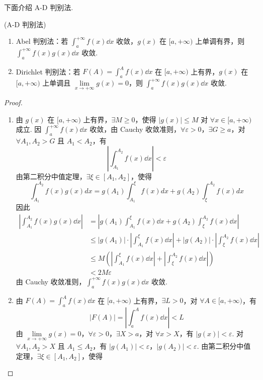 下面介绍 A-D 判别法.
\begin{proposition}(A-D 判别法)
	
	\begin{enumerate}
		\item Abel 判别法：若 $\displaystyle\int_a^{+\infty} f(x)\dd x$ 收敛，$g(x)$ 在 $[a,+\infty)$ 上单调有界，则 $\displaystyle\int_a^{+\infty} f(x)g(x)\dd x$ 收敛.
		\item Dirichlet 判别法：若 $F(A)=\displaystyle\int_a^A f(x)\dd x$ 在 $[a,+\infty)$ 上有界，$g(x)$ 在 $[a,+\infty)$ 上单调且 $\lim\limits_{x \to +\infty} g(x)=0$，则 $\displaystyle\int_a^{+\infty} f(x)g(x)\dd x$ 收敛.
	\end{enumerate}
\end{proposition}
\begin{proof}
	\begin{enumerate}
		\item 由 $g(x)$ 在 $[a,+\infty)$ 上有界，$\exists M \ge 0$，使得 $|g(x)| \le M$ 对 $\forall x \in [a,+\infty)$ 成立.
		因 $\displaystyle\int_a^{+\infty} f(x)\dd x$ 收敛，由 Cauchy 收敛准则，$\forall \varepsilon>0$，$\exists G \ge a$，对 $\forall A_1,A_2 > G$ 且 $A_1 < A_2$，有
		\[
		\left| \int_{A_1}^{A_2} f(x)\dd x \right| < \varepsilon
		\]
		由第二积分中值定理，$\exists \xi \in [A_1,A_2]$，使得
		\[
		\int_{A_1}^{A_2} f(x)g(x)dx = g(A_1)\int_{A_1}^\xi f(x)dx + g(A_2)\int_\xi^{A_2} f(x)dx
		\]
		因此
		\[
		\begin{aligned}
			\left| \int_{A_1}^{A_2} f(x)g(x)\dd x \right|
			&= \left| g(A_1)\int_{A_1}^\xi f(x)\dd x + g(A_2)\int_\xi^{A_2} f(x)\dd x \right| \\
			&\le |g(A_1)| \cdot \left| \int_{A_1}^\xi f(x)\dd x \right| + |g(A_2)| \cdot \left| \int_\xi^{A_2} f(x)\dd x \right| \\
			&\le M \left( \left| \int_{A_1}^\xi f(x)\dd x \right| + \left| \int_\xi^{A_2} f(x)\dd x \right| \right) \\
			&< 2M\varepsilon
		\end{aligned}
		\]
		由 Cauchy 收敛准则，$\displaystyle\int_a^{+\infty} f(x)g(x)\dd x$ 收敛.
		\item 由 $F(A)=\displaystyle\int_a^A f(x)\dd x$ 在 $[a,+\infty)$ 上有界，$\exists L>0$，对 $\forall A \in [a,+\infty)$，有
		\[
		|F(A)| = \left| \int_a^A f(x)\dd x \right| < L
		\]
		由 $\lim\limits_{x \to +\infty} g(x)=0$，$\forall \varepsilon>0$，$\exists X > a$，对 $\forall x > X$，有 $|g(x)| < \varepsilon$.
		对 $\forall A_1,A_2 > X$ 且 $A_1 \le A_2$，有 $|g(A_1)| < \varepsilon$，$|g(A_2)| < \varepsilon$.
		由第二积分中值定理，$\exists \xi \in [A_1,A_2]$，使得

\end{enumerate}
\end{proof}
